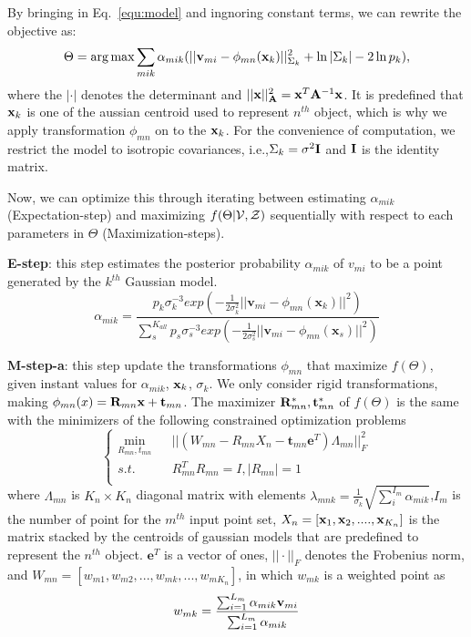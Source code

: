 By bringing in Eq.~\ref{equ:model} and ingnoring  constant terms, we can rewrite the objective as:
\begin{equation}
\label{equ:obj3}
\Theta=\arg\max\sum_{mik}\alpha_{mik}(||\mathbf{v}_{mi}-\phi_{mn}(\mathbf{x}_k)||_{\Sigma_k}^2 + \ln |\Sigma_k| - 2\ln p_k), 
\end{equation}
%
where the $|\cdot|$ denotes the determinant and $||\mathbf{x}||_{\mathbf{A}}^2=\mathbf{x}^T\mathbf{A}^{-1}\mathbf{x}$. 
%
It is predefined that $\mathbf{x}_k$ is one of the aussian centroid used to represent $n^{th}$ object, which is why we apply transformation $\phi_{mn}$ on to the $\mathbf{x}_k$. 
%
For the convenience of computation, we restrict the model to isotropic covariances, i.e.,$\Sigma_k=\sigma^2\mathbf{I}$ and $\mathbf{I}$ is the identity matrix.



Now, we can optimize this through iterating between estimating $\alpha_{mik}$ (Expectation-step) and maximizing $f(\Theta|\mathcal{V},\mathcal{Z})$ sequentially with respect to each parameters in $\Theta$ (Maximization-steps).
%

\textbf{E-step}:
this step estimates the posterior probability $\alpha_{mik}$ of $v_{mi}$ to be a point generated by the $k^{th}$ Gaussian model.
%
\begin{equation}
\label{equ:estep}
\alpha_{mik}=\frac{p_k\sigma_k^{-3}exp(-\frac{1}{2\sigma_k^2}||\pmb v_{mi}-\phi_{mn}(\pmb x_k)||^2)}{\sum_s^{K_{all}}p_s\sigma_s^{-3}exp(-\frac{1}{2\sigma_s^2}||\pmb v_{mi}-\phi_{mn}(\pmb x_s)||^2)}
\end{equation}
%


\textbf{M-step-a}: this step update the transformations $\phi_{mn}$ that maximize $f(\Theta)$, given instant values for $\alpha_{mik}$, $\mathbf{x}_k$, $\sigma_k$. 
%
We only consider rigid transformations, making  $\phi_{mn}(x)=\mathbf{R}_{mn}\mathbf{x}+\mathbf{t}_{mn}$. The maximizer $\mathbf{R}_{mn}^*,\mathbf{t}_{mn}^*$ of $f(\Theta)$ is the same with the minimizers of the following constrained optimization problems
%
\begin{equation}
\left\{
\begin{array}{rcl}
\min_{R_{mn},t_{mn}}&      &||(W_{mn}-R_{mn}X_n-\pmb t_{mn}\mathbf{e}^T)\Lambda_{mn}||_F^2\\
s.t.&      &R_{mn}^TR_{mn}=I, |R_{mn}|=1\\
\end{array} \right.
\end{equation}
where $\Lambda_{mn}$ is $K_n \times K_n$ diagonal matrix with elements $\lambda_{mnk}=\frac{1}{\sigma_k}\sqrt{\sum_i^{I_{m}}\alpha_{mik}}$,$I_m$ is the number of point for the $m^{th}$ input point set, $X_n = [\mathbf{x}_1, \mathbf{x}_2,...., \mathbf{x}_{K_n}]$ is the matrix stacked by the centroids of gaussian models that are predefined to represent the $n^{th}$ object. $\mathbf{e}^T$ is a vector of ones, $||\cdot||_F$ denotes the Frobenius norm, and $W_{mn}=[w_{m1},w_{m2},...,w_{mk},...,w_{mK_n}]$, in which $w_{mk}$ is a weighted point as
%
\begin{equation}
w_{mk}=\frac{\sum_{i=1}^{L_m}\alpha_{mik} \mathbf{v}_{mi}}{\sum_{i=1}^{L_m}\alpha_{mik}}
\end{equation}




